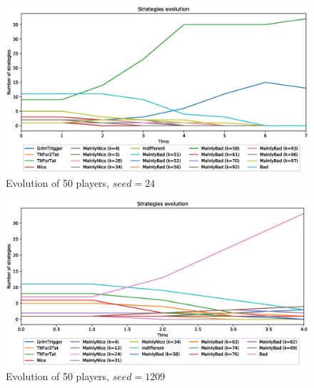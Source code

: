 \documentclass[journal,10pt,twoside]{IEEEtran}
\begin{document}
\begin{figure}[!ht]
    \centering
    \includegraphics[width=1\columnwidth]{../img/ripdmp-const/seed24/ripdmp-evolution-const-pop-50}
    \caption{Evolution of 50 players, $seed = 24$}
    \label{fig:constRseed24}
\end{figure}

\begin{figure}[!ht]
    \centering
    \includegraphics[width=1\columnwidth]{../img/ripdmp-const/seed1209/ripdmp-evolution-const-pop-50}
    \caption{Evolution of 50 players, $seed = 1209$}
    \label{fig:constRseed1209}
\end{figure}
\end{document}
